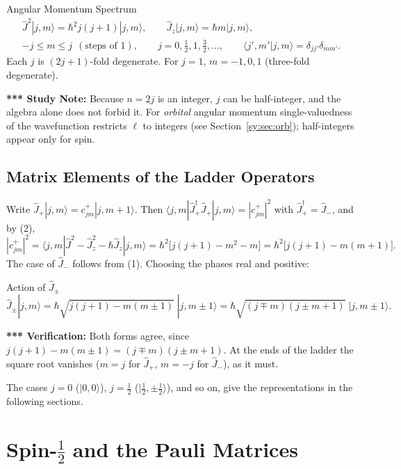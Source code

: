 \documentclass[11pt,a4paper]{article}
\begin{document}
\begin{thm}{Angular Momentum Spectrum}
\begin{gather*}
\hat J^2|j,m\rangle=\hbar^2j(j+1)|j,m\rangle,\qquad \hat J_z|j,m\rangle=\hbar m|j,m\rangle,\\
-j\le m\le j\ \ (\text{steps of }1),\qquad j=0,\tfrac12,1,\tfrac32,\dots,\qquad \langle j',m'|j,m\rangle=\delta_{jj'}\delta_{mm'}.
\end{gather*}
Each $j$ is $(2j+1)$-fold degenerate. For $j=1$, $m=-1,0,1$ (three-fold degenerate).
\end{thm}

\textbf{*** Study Note:} Because $n=2j$ is an integer, $j$ can be half-integer, and the algebra alone does not forbid it. For \emph{orbital} angular momentum single-valuedness of the wavefunction restricts $\ell$ to integers (see Section~\ref{sy:sec:orb}); half-integers appear only for spin.

\subsection{Matrix Elements of the Ladder Operators}
Write $\hat J_+|j,m\rangle=c^+_{jm}|j,m+1\rangle$. Then $\langle j,m|\hat J_+^\dagger\hat J_+|j,m\rangle=|c^+_{jm}|^2$ with $\hat J_+^\dagger=\hat J_-$, and by (2),
\[
|c^+_{jm}|^2=\langle j,m|\hat J^2-\hat J_z^2-\hbar\hat J_z|j,m\rangle=\hbar^2\big[j(j+1)-m^2-m\big]=\hbar^2\big[j(j+1)-m(m+1)\big].
\]
The case of $\hat J_-$ follows from (1). Choosing the phases real and positive:

\begin{thm}{Action of $\hat J_\pm$}
\[
\hat J_\pm|j,m\rangle=\hbar\sqrt{j(j+1)-m(m\pm1)}\;|j,m\pm1\rangle=\hbar\sqrt{(j\mp m)(j\pm m+1)}\;|j,m\pm1\rangle .
\]
\end{thm}

\textbf{*** Verification:} Both forms agree, since $j(j+1)-m(m\pm1)=(j\mp m)(j\pm m+1)$. At the ends of the ladder the square root vanishes ($m=j$ for $\hat J_+$, $m=-j$ for $\hat J_-$), as it must.

The cases $j=0$ ($|0,0\rangle$), $j=\tfrac12$ ($|\tfrac12,\pm\tfrac12\rangle$), and so on, give the representations in the following sections.

\section{Spin-\texorpdfstring{$\tfrac12$}{1/2} and the Pauli Matrices}
\label{sy:sec:spin}
\end{document}
